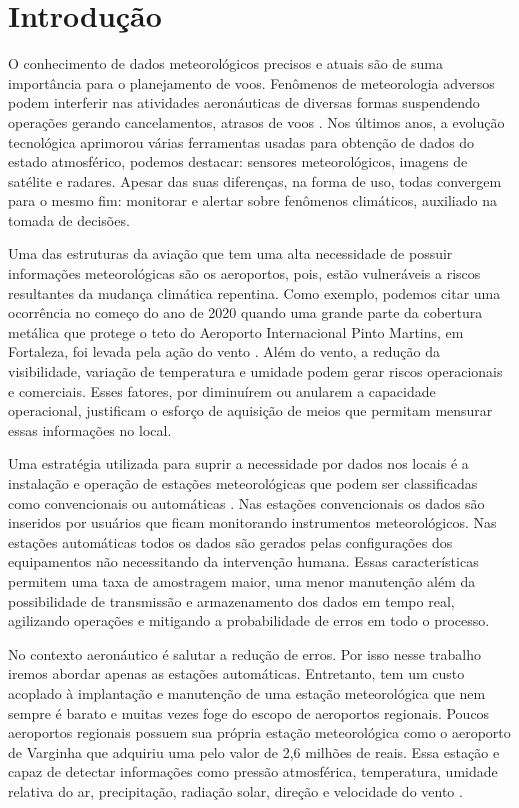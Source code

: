 \chapter{Introdução} \label{Introducao}

O conhecimento de dados meteorológicos precisos e atuais são de suma importância para o planejamento de voos. Fenômenos de meteorologia adversos podem interferir nas atividades aeronáuticas de diversas formas suspendendo operações gerando cancelamentos, atrasos de voos \cite{costa2008meteorologia}. Nos últimos anos, a evolução tecnológica aprimorou várias ferramentas usadas para obtenção de dados do estado atmosférico, podemos destacar: sensores meteorológicos, imagens de satélite e radares. Apesar das suas diferenças, na forma de uso, todas convergem para o mesmo fim: monitorar e alertar sobre fenômenos climáticos, auxiliado na tomada de decisões.

Uma das estruturas da aviação que tem uma alta necessidade de possuir informações meteorológicas são os aeroportos, pois, estão vulneráveis a riscos resultantes da mudança climática repentina. Como exemplo, podemos citar uma ocorrência no começo do ano de 2020 quando uma grande parte da cobertura metálica que protege o teto do Aeroporto Internacional Pinto Martins, em Fortaleza, foi levada pela ação do vento \cite{DiariodoNordeste}. Além do vento, a redução da visibilidade, variação de temperatura e umidade podem gerar riscos operacionais e comerciais. Esses fatores, por diminuírem ou anularem a capacidade operacional, justificam o esforço de aquisição de meios que permitam mensurar essas informações no local.

Uma estratégia utilizada para suprir a necessidade por dados nos locais é a instalação e operação de estações meteorológicas que podem ser classificadas como convencionais ou automáticas \cite{guimaraes2020clima}. Nas estações convencionais os dados são inseridos por usuários que ficam monitorando instrumentos meteorológicos. Nas estações automáticas todos os dados são gerados pelas configurações dos equipamentos não necessitando da intervenção humana. Essas características permitem uma taxa de amostragem maior, uma menor manutenção além da possibilidade de transmissão e armazenamento dos dados em tempo real, agilizando operações e mitigando a probabilidade de erros em todo o processo\cite{braga2011estaccoes}.

No contexto aeronáutico é salutar a redução de erros. Por isso nesse trabalho iremos abordar apenas as estações automáticas. Entretanto, tem um custo acoplado à implantação e manutenção de uma estação meteorológica que nem sempre é barato e muitas vezes foge do escopo de aeroportos regionais. Poucos aeroportos regionais possuem sua própria estação meteorológica  como o aeroporto de Varginha que adquiriu uma pelo valor de 2,6 milhões de reais. Essa estação e capaz de detectar informações como pressão atmosférica, temperatura, umidade relativa do ar, precipitação, radiação solar, direção e velocidade do vento \cite{EPTV}. 

